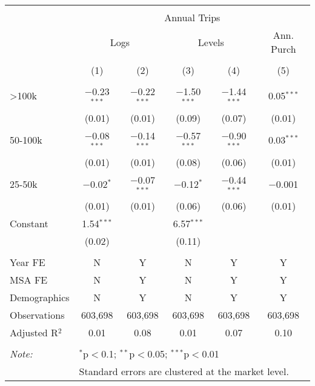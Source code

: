 
\begin{table}[!htbp] \centering 
  \caption{} 
  \label{tab:tripFrequency} 
\begin{tabular}{@{\extracolsep{5pt}}lccccc} 
\\[-1.8ex]\hline 
\hline \\[-1.8ex] 
 & \multicolumn{5}{c}{Annual Trips} \\ 
\cline{2-6} 
 & \multicolumn{2}{c}{Logs} & \multicolumn{2}{c}{Levels} & Ann. Purch \\ 
\\[-1.8ex] & (1) & (2) & (3) & (4) & (5)\\ 
\hline \\[-1.8ex] 
 >100k & $-$0.23$^{***}$ & $-$0.22$^{***}$ & $-$1.50$^{***}$ & $-$1.44$^{***}$ & 0.05$^{***}$ \\ 
  & (0.01) & (0.01) & (0.09) & (0.07) & (0.01) \\ 
  50-100k & $-$0.08$^{***}$ & $-$0.14$^{***}$ & $-$0.57$^{***}$ & $-$0.90$^{***}$ & 0.03$^{***}$ \\ 
  & (0.01) & (0.01) & (0.08) & (0.06) & (0.01) \\ 
  25-50k & $-$0.02$^{*}$ & $-$0.07$^{***}$ & $-$0.12$^{*}$ & $-$0.44$^{***}$ & $-$0.001 \\ 
  & (0.01) & (0.01) & (0.06) & (0.06) & (0.01) \\ 
  Constant & 1.54$^{***}$ &  & 6.57$^{***}$ &  &  \\ 
  & (0.02) &  & (0.11) &  &  \\ 
 \hline \\[-1.8ex] 
Year FE & N & Y & N & Y & Y \\ 
MSA FE & N & Y & N & Y & Y \\ 
Demographics & N & Y & N & Y & Y \\ 
Observations & 603,698 & 603,698 & 603,698 & 603,698 & 603,698 \\ 
Adjusted R$^{2}$ & 0.01 & 0.08 & 0.01 & 0.07 & 0.10 \\ 
\hline 
\hline \\[-1.8ex] 
\textit{Note:}  & \multicolumn{5}{l}{$^{*}$p$<$0.1; $^{**}$p$<$0.05; $^{***}$p$<$0.01} \\ 
 & \multicolumn{5}{l}{Standard errors are clustered at the market level.} \\ 
\end{tabular} 
\end{table} 
